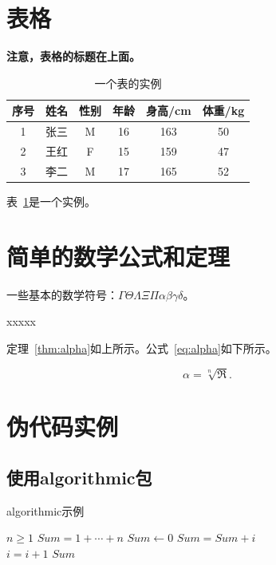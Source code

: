 \section{表格}

\textbf{注意，表格的标题在上面。}
\begin{table}[!ht]
\centering
\caption{一个表的实例}
\begin{tabular}{cccccc}
    \toprule
    序号 & 姓名 & 性别 & 年龄 & 身高/cm & 体重/kg \\
    \midrule
    1 & 张三 & M & 16 & 163 & 50 \\
    2 & 王红 & F & 15 & 159 & 47 \\
    3 & 李二 & M & 17 & 165 & 52 \\
    \bottomrule
\end{tabular}
\label{tab:tabobj}
\end{table}
表~\ref{tab:tabobj}是一个实例。


\section{简单的数学公式和定理}

一些基本的数学符号：$\Gamma\Theta\Lambda\Xi\Pi\alpha\beta\gamma\delta$。

\begin{theo} [存在性定理]
\label{thm:alpha}
    xxxxx
\end{theo}

定理~\ref{thm:alpha}如上所示。公式~\ref{eq:alpha}如下所示。

\begin{equation}
\label{eq:alpha}
    \alpha=\sqrt[n]{\Re}.
\end{equation}


\section{伪代码实例}

\subsection{使用algorithmic包}

\begin{algorithm}[!ht]
\caption{algorithmic示例}
\begin{algorithmic}[1] %
    \REQUIRE $n \geq 1$                  %
    \ENSURE $Sum = 1 + \cdots + n$       %
    \STATE $Sum \leftarrow 0$            %
    \ELSE
            \STATE $Sum = Sum + i$\\
            \STATE $i = i + 1$
        \ENDFOR
    \ENDIF
    \RETURN $Sum$
\end{algorithmic}
\label{alg}
\end{algorithm}


